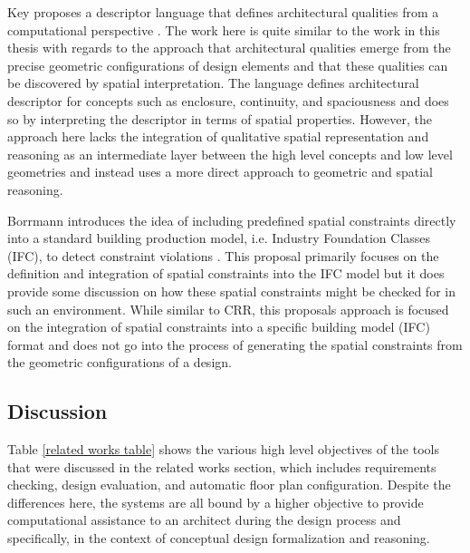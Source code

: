 \documentclass[12pt]{ucthesis}
\begin{document}
Key proposes a descriptor language that defines architectural qualities from a computational perspective \cite{Key}. The work here is quite similar to the work in this thesis with regards to the approach that architectural qualities emerge from the precise geometric configurations of design elements and that these qualities can be discovered by spatial interpretation. The language defines architectural descriptor for concepts such as enclosure, continuity, and spaciousness and does so by interpreting the descriptor in terms of spatial properties. However, the approach here lacks the integration of qualitative spatial representation and reasoning as an intermediate layer between the high level concepts and low level geometries and instead uses a more direct approach to geometric and spatial reasoning.

Borrmann introduces the idea of including predefined spatial constraints directly into a standard building production model, i.e. Industry Foundation Classes (IFC), to detect constraint violations \cite{Borrmann}. This proposal primarily focuses on the definition and integration of spatial constraints into the IFC model but it does provide some discussion on how these spatial constraints might be checked for in such an environment. While similar to CRR, this proposals approach is focused on the integration of spatial constraints into a specific building model (IFC) format and does not go into the process of generating the spatial constraints from the geometric configurations of a design. 

\subsection{Discussion}
Table \ref{related works table} shows the various high level objectives of the tools that were discussed in the related works section, which includes requirements checking, design evaluation, and automatic floor plan configuration. Despite the differences here, the systems are all bound by a higher objective to provide computational assistance to an architect during the design process and specifically, in the context of conceptual design formalization and reasoning.


\begin{table}[H]
  \begin{center}
  \end{center}
\caption{System Objectives}
\label{related works table}
\end{table}   
\end{document}
